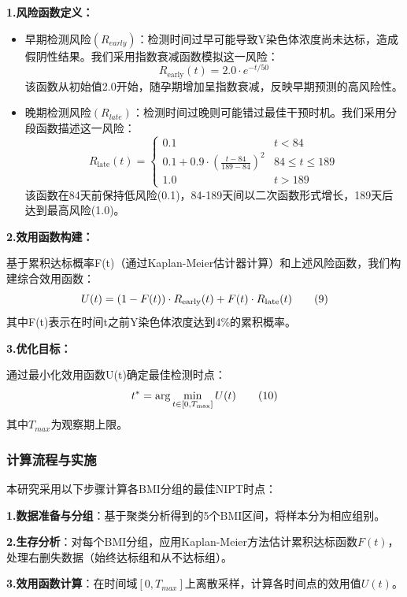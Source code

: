 \documentclass{article}
\begin{document}
\textbf{1.风险函数定义：}
\begin{itemize}
    \item 早期检测风险$(R_{early})$：检测时间过早可能导致Y染色体浓度尚未达标，造成假阴性结果。我们采用指数衰减函数模拟这一风险：
          \[
              R_{\text{early}}(t) = 2.0 \cdot e^{-t/50} \tag{7}
          \]
          该函数从初始值2.0开始，随孕期增加呈指数衰减，反映早期预测的高风险性。
    \item 晚期检测风险$(R_{late})$：检测时间过晚则可能错过最佳干预时机。我们采用分段函数描述这一风险：
          \[
              R_{\text{late}}(t) =
              \begin{cases}
                  0.1                                                  & t < 84             \\
                  0.1 + 0.9 \cdot \left( \frac{t-84}{189-84} \right)^2 & 84 \leq t \leq 189 \\
                  1.0                                                  & t > 189
              \end{cases} \tag{8}
          \]
          该函数在84天前保持低风险(0.1)，84-189天间以二次函数形式增长，189天后达到最高风险(1.0)。
\end{itemize}

\textbf{2.效用函数构建：}

基于累积达标概率F(t)（通过Kaplan-Meier估计器计算）和上述风险函数，我们构建综合效用函数：
\[
    U(t) = (1 - F(t)) \cdot R_{\text{early}}(t) + F(t) \cdot R_{\text{late}}(t)\tag{9} \\
\]
其中F(t)表示在时间t之前Y染色体浓度达到4\%的累积概率。

\textbf{3.优化目标：}

通过最小化效用函数U(t)确定最佳检测时点：
\[
    t^* = \arg\min_{t \in [0, T_{\text{max}}]} U(t)\tag{10} \\
\]
其中$T_{max}$为观察期上限。

\subsubsection{\textbf{计算流程与实施}}
本研究采用以下步骤计算各BMI分组的最佳NIPT时点：

\textbf{1.数据准备与分组}：基于聚类分析得到的5个BMI区间，将样本分为相应组别。

\textbf{2.生存分析}：对每个BMI分组，应用Kaplan-Meier方法估计累积达标函数$F(t)$，处理右删失数据（始终达标组和从不达标组）。

\textbf{3.效用函数计算}：在时间域$[0, T_{max}]$上离散采样，计算各时间点的效用值$U(t)$。
\end{document}
